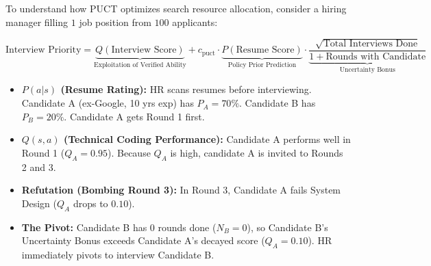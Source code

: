 \documentclass[11pt,a4paper]{article}
\begin{document}
To understand how PUCT optimizes search resource allocation, consider a hiring manager filling $1$ job position from $100$ applicants:

\begin{equation}
\text{Interview Priority} = \underbrace{Q(\text{Interview Score})}_{\text{Exploitation of Verified Ability}} + c_{\text{puct}} \cdot \underbrace{P(\text{Resume Score})}_{\text{Policy Prior Prediction}} \cdot \underbrace{\frac{\sqrt{\text{Total Interviews Done}}}{1 + \text{Rounds with Candidate}}}_{\text{Uncertainty Bonus}}
\end{equation}

\begin{itemize}
    \item \textbf{$P(a|s)$ (Resume Rating):} HR scans resumes before interviewing. Candidate A (ex-Google, 10 yrs exp) has $P_A = 70\%$. Candidate B has $P_B = 20\%$. Candidate A gets Round 1 first.
    \item \textbf{$Q(s,a)$ (Technical Coding Performance):} Candidate A performs well in Round 1 ($Q_A = 0.95$). Because $Q_A$ is high, candidate A is invited to Rounds 2 and 3.
    \item \textbf{Refutation (Bombing Round 3):} In Round 3, Candidate A fails System Design ($Q_A$ drops to $0.10$).
    \item \textbf{The Pivot:} Candidate B has $0$ rounds done ($N_B=0$), so Candidate B's Uncertainty Bonus exceeds Candidate A's decayed score ($Q_A = 0.10$). HR immediately pivots to interview Candidate B.
\end{itemize}
\end{document}
